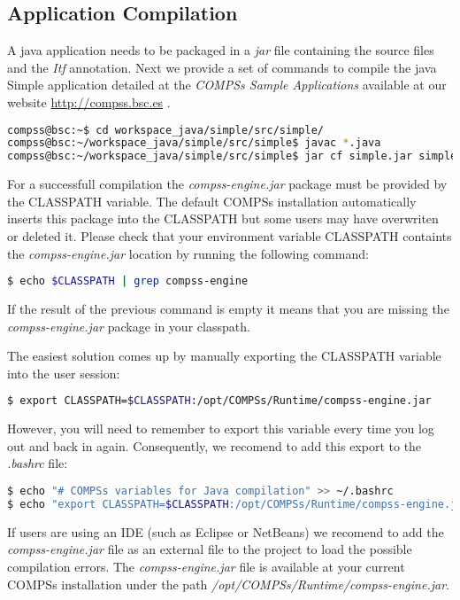 \subsection{Application Compilation}
A java application needs to be packaged in a \textit{jar} file containing the source files and the \textit{Itf} annotation.
Next we provide a set of commands to compile the java Simple application detailed at the \textit{COMPSs Sample Applications} 
available at our website \url{http://compss.bsc.es} .
\begin{lstlisting}[language=bash]
compss@bsc:~$ cd workspace_java/simple/src/simple/
compss@bsc:~/workspace_java/simple/src/simple$ javac *.java
compss@bsc:~/workspace_java/simple/src/simple$ jar cf simple.jar simple 
\end{lstlisting}

For a successfull compilation the \textit{compss-engine.jar} package must be provided by the CLASSPATH variable. The default COMPSs
installation automatically inserts this package into the CLASSPATH but some users may have overwriten or deleted it. Please check
that your environment variable CLASSPATH containts the \textit{compss-engine.jar} location by running the following command:
\begin{lstlisting}[language=bash]
$ echo $CLASSPATH | grep compss-engine
\end{lstlisting}
If the result of the previous command is empty it means that you are missing the \textit{compss-engine.jar} package in your classpath. 

The easiest solution comes up by manually exporting the CLASSPATH variable into the user session:
\begin{lstlisting}[language=bash]
$ export CLASSPATH=$CLASSPATH:/opt/COMPSs/Runtime/compss-engine.jar
\end{lstlisting}
However, you will need to remember to export this variable every time you log out and back in again. Consequently, we recomend to 
add this export to the \textit{.bashrc} file:
\begin{lstlisting}[language=bash]
$ echo "# COMPSs variables for Java compilation" >> ~/.bashrc
$ echo "export CLASSPATH=$CLASSPATH:/opt/COMPSs/Runtime/compss-engine.jar" >> ~/.bashrc
\end{lstlisting}

If users are using an IDE (such as Eclipse or NetBeans) we recomend to add the \textit{compss-engine.jar} file as an external file 
to the project to load the possible compilation errors. The \textit{compss-engine.jar} file is available at your current 
COMPSs installation under the path \textit{/opt/COMPSs/Runtime/compss-engine.jar}.

